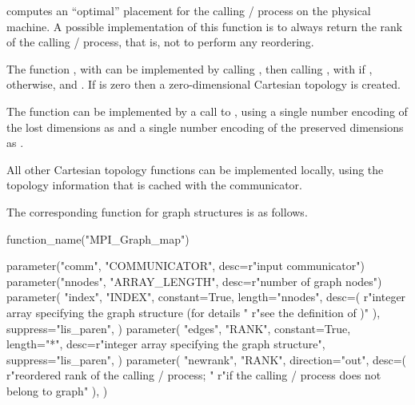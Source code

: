 computes an ``optimal'' placement for the calling \MPI/ process on the
physical machine.  A possible implementation of this function is to always
return the rank of the calling \MPI/ process, that is, not to perform any reordering.

\begin{implementors}
The function , with  can be implemented by
calling
, then calling\flushline
{}, with
 if \flushline
{},  otherwise,
and . If  is zero
then a zero-dimensional Cartesian topology is created.

The function  can be
implemented by a call to ,
using a single number encoding of the lost dimensions as  and a
single number encoding of the preserved dimensions as .

All other Cartesian topology functions can be implemented locally, using
the topology information that is cached with the communicator.
\end{implementors}

The corresponding function for
graph structures is as follows.

\begin{mpi-binding}
    function_name("MPI_Graph_map")
    
    parameter("comm", "COMMUNICATOR", desc=r"input communicator")
    parameter("nnodes", "ARRAY_LENGTH", desc=r"number of graph nodes")
    parameter(
        "index",
        "INDEX",
        constant=True,
        length="nnodes",
        desc=(
            r"integer array specifying the graph structure (for details "
            r"see the definition of )"
        ),
        suppress="lis_paren",
    )
    parameter(
        "edges",
        "RANK",
        constant=True,
        length="*",
        desc=r"integer array specifying the graph structure",
        suppress="lis_paren",
    )
    parameter(
        "newrank",
        "RANK",
        direction="out",
        desc=(
            r"reordered rank of the calling \MPI/ process;  "
            r"if the calling \MPI/ process does not belong to graph"
        ),
    )
\end{mpi-binding}


